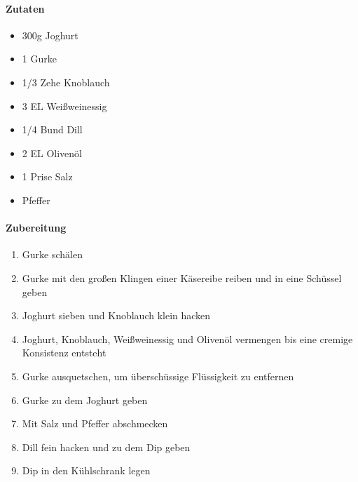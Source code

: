\newpage
{}

\paragraph{Zutaten}
\begin{itemize}[noitemsep]
	\item 300g Joghurt
	\item 1 Gurke
	\item 1/3 Zehe Knoblauch
	\item 3 EL Weißweinessig
	\item 1/4 Bund Dill
	\item 2 EL Olivenöl
	\item 1 Prise Salz
	\item Pfeffer
\end{itemize}

\paragraph{Zubereitung}
\begin{enumerate}[noitemsep]
	\item Gurke schälen
	\item Gurke mit den großen Klingen einer Käsereibe reiben und in eine Schüssel geben
	\item Joghurt sieben und Knoblauch klein hacken
	\item Joghurt, Knoblauch, Weißweinessig und Olivenöl vermengen bis eine cremige Konsistenz entsteht
	\item Gurke ausquetschen, um überschüssige Flüssigkeit zu entfernen
	\item Gurke zu dem Joghurt geben 
	\item Mit Salz und Pfeffer abschmecken
	\item Dill fein hacken und zu dem Dip geben
	\item Dip in den Kühlschrank legen
\end{enumerate}